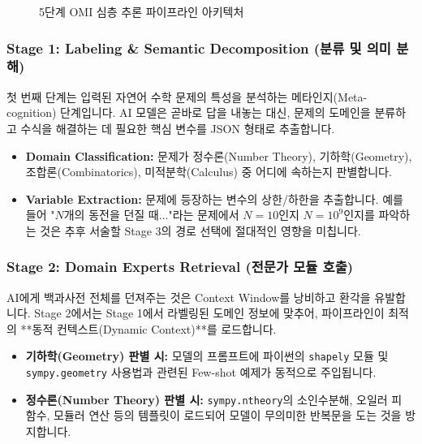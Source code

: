 \begin{figure}[htbp]
\caption{5단계 OMI 심층 추론 파이프라인 아키텍처}
\label{fig:5stage_pipeline}
\end{figure}

\subsubsection{Stage 1: Labeling \& Semantic Decomposition (분류 및 의미 분해)}
첫 번째 단계는 입력된 자연어 수학 문제의 특성을 분석하는 메타인지(Meta-cognition) 단계입니다. AI 모델은 곧바로 답을 내놓는 대신, 문제의 도메인을 분류하고 수식을 해결하는 데 필요한 핵심 변수를 JSON 형태로 추출합니다.
\begin{itemize}
    \item \textbf{Domain Classification:} 문제가 정수론(Number Theory), 기하학(Geometry), 조합론(Combinatorics), 미적분학(Calculus) 중 어디에 속하는지 판별합니다.
    \item \textbf{Variable Extraction:} 문제에 등장하는 변수의 상한/하한을 추출합니다. 예를 들어 "$N$개의 동전을 던질 때..."라는 문제에서 $N=10$인지 $N=10^9$인지를 파악하는 것은 추후 서술할 Stage 3의 경로 선택에 절대적인 영향을 미칩니다.
\end{itemize}

\subsubsection{Stage 2: Domain Experts Retrieval (전문가 모듈 호출)}
AI에게 백과사전 전체를 던져주는 것은 Context Window를 낭비하고 환각을 유발합니다. Stage 2에서는 Stage 1에서 라벨링된 도메인 정보에 맞추어, 파이프라인이 최적의 **동적 컨텍스트(Dynamic Context)**를 로드합니다.
\begin{itemize}
    \item \textbf{기하학(Geometry) 판별 시:} 모델의 프롬프트에 파이썬의 \texttt{shapely} 모듈 및 \texttt{sympy.\allowbreak geometry} 사용법과 관련된 Few-shot 예제가 동적으로 주입됩니다.
    \item \textbf{정수론(Number Theory) 판별 시:} \texttt{sympy.\allowbreak ntheory}의 소인수분해, 오일러 피 함수, 모듈러 연산 등의 템플릿이 로드되어 모델이 무의미한 반복문을 도는 것을 방지합니다.
\end{itemize}

